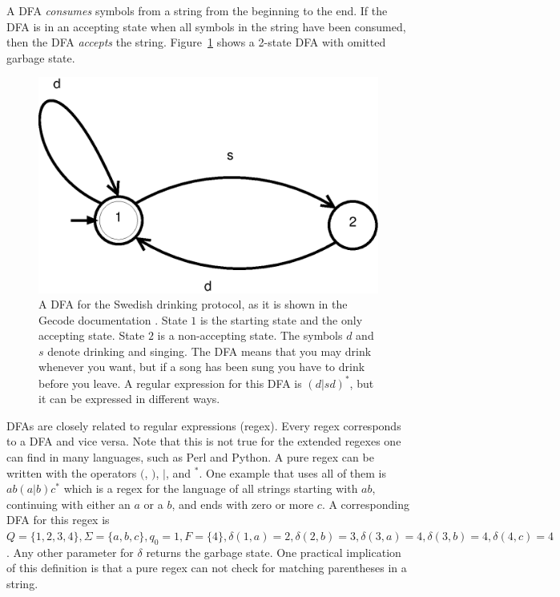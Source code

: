 \documentclass[a4paper,11pt]{article}
\begin{document}
A DFA \textit{consumes} symbols from a string from the beginning to the end. If the DFA is in an accepting state when all symbols in the string have been consumed, then the DFA \textit{accepts} the string. Figure~\ref{fig:dfasdp} shows a 2-state DFA with omitted garbage state.

\begin{figure}[H]
\centering
\includegraphics[scale=0.6]{dfa.eps}
\caption{A DFA for the Swedish drinking protocol, as it is shown in the Gecode documentation \cite{mpg}. State $1$ is the starting state and the only accepting state. State $2$ is a non-accepting state. The symbols $d$ and $s$ denote drinking and singing. The DFA means that you may drink whenever you want, but if a song has been sung you have to drink before you leave. A regular expression for this DFA is $(d|sd)^{*}$, but it can be expressed in different ways.}
\label{fig:dfasdp}
\end{figure}


DFAs are closely related to regular expressions (regex). Every regex corresponds to a DFA and vice versa. Note that this is not true for the extended regexes one can find in many languages, such as Perl and Python. A pure regex can be written with the operators $($, $)$, $|$, and $^{*}$. One example that uses all of them is $ab(a|b)c^{*}$ which is a regex for the language of all strings starting with $ab$, continuing with either an $a$ or a $b$, and ends with zero or more $c$. A corresponding DFA for this regex is $Q=\{1,2,3,4\}, \Sigma=\{a,b,c\}, q_0=1, F=\{4\}, \delta(1,a)=2, \delta(2,b)=3, \delta(3,a)=4, \delta(3,b)=4, \delta(4,c)=4$. Any other parameter for $\delta$ returns the garbage state. One practical implication of this definition is that a pure regex can not check for matching parentheses in a string.
\end{document}
